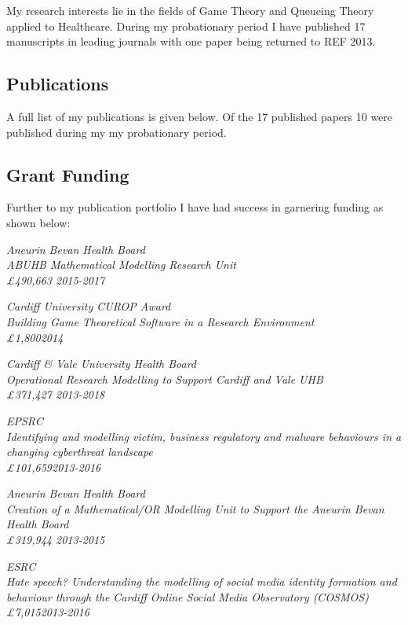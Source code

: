 \documentclass{article}
\begin{document}
My research interests lie in the fields of Game Theory and Queueing Theory applied to Healthcare.
During my probationary period I have published 17 manuscripts in leading journals with one paper being returned to REF 2013.

\subsection{Publications}

A full list of my publications is given below. Of the 17 published papers 10 were published during my my probationary period.



\subsection{Grant Funding}

Further to my publication portfolio I have had success in garnering funding as shown below:

\sl{Aneurin Bevan Health Board}\\
ABUHB Mathematical Modelling Research Unit\\
\pounds490,663 \hfill{2015-2017}


\sl{Cardiff University CUROP Award}\\
Building Game Theoretical Software in a Research Environment\\
\pounds1,800\hfill{2014}


\sl{Cardiff \& Vale University Health Board}\\
Operational Research Modelling to Support Cardiff and Vale UHB\\
\pounds 371,427 \hfill{2013-2018}


\sl{EPSRC}\\
Identifying and modelling victim, business regulatory and malware behaviours in a changing cyberthreat landscape\\
\pounds101,659\hfill{2013-2016}


\sl{Aneurin Bevan Health Board}\\
Creation of a Mathematical/OR Modelling Unit to Support the Aneurin Bevan Health Board\\
\pounds319,944 \hfill{2013-2015}


\sl{ESRC}\\
Hate speech? Understanding the modelling of social media identity formation and behaviour through the Cardiff Online Social Media Observatory (COSMOS)\\
\pounds7,015\hfill{2013-2016}
\end{document}

